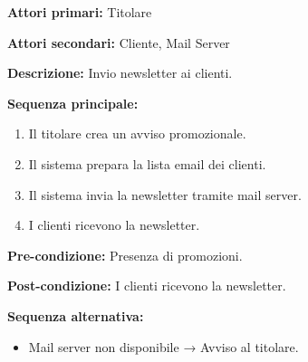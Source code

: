 \documentclass[12pt, a4paper]{article}
\begin{document}
\vspace{1em}

\begin{tcolorbox}[
  title=Scenario: Invio Newsletter,
  coltitle=black,
  colbacktitle=cyan!10,
  colback=white,
  colframe=gray!60!black,
  fonttitle=\bfseries,
  sharp corners=south
]
\textbf{Attori primari:} Titolare

\textbf{Attori secondari:} Cliente, Mail Server

\textbf{Descrizione:} Invio newsletter ai clienti.

\vspace{0.5em}
\textbf{Sequenza principale:}
\begin{enumerate}
  \item Il titolare crea un avviso promozionale.
  \item Il sistema prepara la lista email dei clienti.
  \item Il sistema invia la newsletter tramite mail server.
  \item I clienti ricevono la newsletter.
\end{enumerate}

\textbf{Pre-condizione:} Presenza di promozioni.

\textbf{Post-condizione:} I clienti ricevono la newsletter.

\textbf{Sequenza alternativa:}
\begin{itemize}
  \item Mail server non disponibile → Avviso al titolare.
\end{itemize}
\end{tcolorbox}

\vspace{1em}
\end{document}
